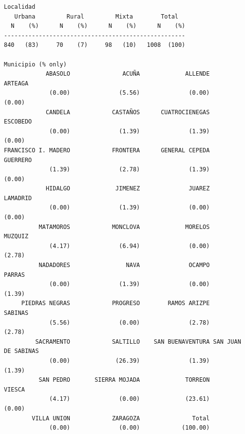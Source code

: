 \documentclass[letter,12pt]{article}
\begin{document}
\begin{scriptsize}
\begin{verbatim}
Localidad
   Urbana         Rural         Mixta        Total
  N    (%)      N    (%)      N    (%)      N    (%)
----------------------------------------------------
840   (83)     70    (7)     98   (10)   1008  (100)

Municipio (% only)
            ABASOLO               ACUÑA             ALLENDE             ARTEAGA 
             (0.00)              (5.56)              (0.00)              (0.00) 
            CANDELA            CASTAÑOS      CUATROCIENEGAS            ESCOBEDO 
             (0.00)              (1.39)              (1.39)              (0.00) 
FRANCISCO I. MADERO            FRONTERA      GENERAL CEPEDA            GUERRERO 
             (1.39)              (2.78)              (1.39)              (0.00) 
            HIDALGO             JIMENEZ              JUAREZ            LAMADRID 
             (0.00)              (1.39)              (0.00)              (0.00) 
          MATAMOROS            MONCLOVA             MORELOS             MUZQUIZ 
             (4.17)              (6.94)              (0.00)              (2.78) 
          NADADORES                NAVA              OCAMPO              PARRAS 
             (0.00)              (1.39)              (0.00)              (1.39) 
     PIEDRAS NEGRAS            PROGRESO        RAMOS ARIZPE             SABINAS 
             (5.56)              (0.00)              (2.78)              (2.78) 
         SACRAMENTO            SALTILLO    SAN BUENAVENTURA SAN JUAN DE SABINAS 
             (0.00)             (26.39)              (1.39)              (1.39) 
          SAN PEDRO       SIERRA MOJADA             TORREON              VIESCA 
             (4.17)              (0.00)             (23.61)              (0.00) 
        VILLA UNION            ZARAGOZA               Total
             (0.00)              (0.00)            (100.00)


\end{verbatim}
\end{scriptsize}
\end{document}
